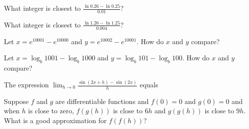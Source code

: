 \documentclass{ximera}
\newcommand{\recommendation}[1]{}
\newcommand{\GoodQuestions}[1]{}
\begin{document}
\begin{problem}
  What integer is closest to $\frac{\ln 0.26 - \ln 0.25}{0.01}$?
  \begin{multipleChoice}
  \end{multipleChoice}
\end{problem}

\begin{problem}
  What integer is closest to $\frac{\ln 1.26 - \ln 1.25}{0.004}$?
  \begin{multipleChoice}
  \end{multipleChoice}
\end{problem}

\begin{problem}
  Let $x = e^{10001} - e^{10000}$ and $y = e^{10002} - e^{10001}$.  How do $x$ and $y$ compare?
  \begin{multipleChoice}
  \end{multipleChoice}
\end{problem}

\begin{problem}
  Let $x = \log_b 1001 - \log_b 1000$ and $y = \log_b 101 - \log_b 100$.  How do $x$ and $y$ compare?
  \begin{multipleChoice}
  \end{multipleChoice}
\end{problem}

\begin{problem}
  \recommendation{Vic}
  \GoodQuestions{Subject: Derivative Rules 15P}
  The expression $\lim_{h\to 0}\frac{\sin (2x+h)-\sin (2x)}{h}$ equals
  \begin{multipleChoice}
  \end{multipleChoice}
\end{problem}

\begin{problem}
  Suppose $f$ and $g$ are differentiable functions and $f(0) = 0$ and
  $g(0) = 0$ and when $h$ is close to zero, $f(g(h))$ is close to $6h$
  and $g(g(h))$ is close to $9h$.  What is a good approximation for $f(f(h))$?
  \begin{multipleChoice}
  \end{multipleChoice}
\end{problem}
\end{document}
